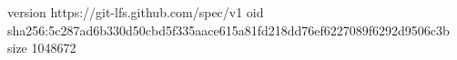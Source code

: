 version https://git-lfs.github.com/spec/v1
oid sha256:5c287ad6b330d50cbd5f335aace615a81fd218dd76ef6227089f6292d9506c3b
size 1048672

